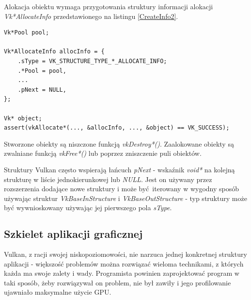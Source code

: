Alokacja obiektu wymaga przygotowania struktury informacji alokacji \textit{Vk*AllocateInfo} przedstawionego na listingu \ref{CreateInfo2}.
\lstset{language=C}
\begin{lstlisting}[caption={Alokacja obiektu Vulkan},captionpos=b,label={CreateInfo2}]
Vk*Pool pool;

Vk*AllocateInfo allocInfo = {
	.sType = VK_STRUCTURE_TYPE_*_ALLOCATE_INFO;
	.*Pool = pool,
	...
	.pNext = NULL,
};

Vk* object;
assert(vkAllocate*(..., &allocInfo, ..., &object) == VK_SUCCESS);
\end{lstlisting}

Stworzone obiekty są niszczone funkcją \textit{vkDestroy*()}.
Zaalokowane obiekty są zwalniane funkcją \textit{vkFree*()} lub poprzez zniszczenie puli obiektów.

Struktury Vulkan często wspierają łańcuch \textit{pNext} - wskaźnik \textit{void*} na kolejną strukturę w liście jednokierunkowej lub \textit{NULL}. Jest on używany przez rozszerzenia dodające nowe struktury i może być iterowany w wygodny sposób używając struktur \textit{VkBaseInStructure} i \textit{VkBaseOutStructure} - typ struktury może być wywnioskowany używając jej pierwszego pola \textit{sType}.

\subsection{Szkielet aplikacji graficznej}

Vulkan, z racji swojej niskopoziomowości, nie narzuca jednej konkretnej struktury aplikacji - większość problemów można rozwiązać wieloma technikami, z których każda ma swoje zalety i wady.
Programista powinien zaprojektować program w taki sposób, żeby rozwiązywał on problem, nie był zawiły i jego profilowanie ujawniało maksymalne użycie GPU.

